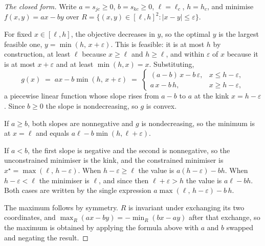 \begin{proof}[The closed form]
Write $a = s_{jc} \ge 0$, $b = s_{kc} \ge 0$, $\ell = \ell_c$, $h = h_c$, and minimise
$f(x,y) = a x - b y$ over
$R = \{(x,y) \in [\ell,h]^2 : |x - y| \le \varepsilon\}$.

For fixed $x \in [\ell,h]$, the objective decreases in $y$, so the optimal $y$ is the largest
feasible one, $y = \min(h,\, x + \varepsilon)$. This is feasible: it is at most $h$ by
construction, at least $\ell$ because $x \ge \ell$ and $h \ge \ell$, and within $\varepsilon$
of $x$ because it is at most $x + \varepsilon$ and at least $\min(h,x) = x$. Substituting,
\[
g(x) \;=\; a x - b \min(h,\, x + \varepsilon)
\;=\;
\begin{cases}
(a - b)\,x - b\,\varepsilon, & x \le h - \varepsilon, \\
a\,x - b\,h, & x \ge h - \varepsilon,
\end{cases}
\]
a piecewise linear function whose slope rises from $a - b$ to $a$ at the kink
$x = h - \varepsilon$. Since $b \ge 0$ the slope is nondecreasing, so $g$ is convex.

If $a \ge b$, both slopes are nonnegative and $g$ is nondecreasing, so the minimum is at
$x = \ell$ and equals $a\ell - b\min(h, \ell + \varepsilon)$.

If $a < b$, the first slope is negative and the second is nonnegative, so the unconstrained
minimiser is the kink, and the constrained minimiser is $x^{\star} = \max(\ell,\, h -
\varepsilon)$. When $h - \varepsilon \ge \ell$ the value is $a(h-\varepsilon) - bh$. When
$h - \varepsilon < \ell$ the minimiser is $\ell$, and since then $\ell + \varepsilon > h$ the
value is $a\ell - bh$. Both cases are written by the single expression
$a\max(\ell,\, h - \varepsilon) - b\,h$.

The maximum follows by symmetry. $R$ is invariant under exchanging its two coordinates, and
$\max_R (a x - b y) = -\min_R (b x - a y)$ after that exchange, so the maximum is obtained by
applying the formula above with $a$ and $b$ swapped and negating the result.
\end{proof}

